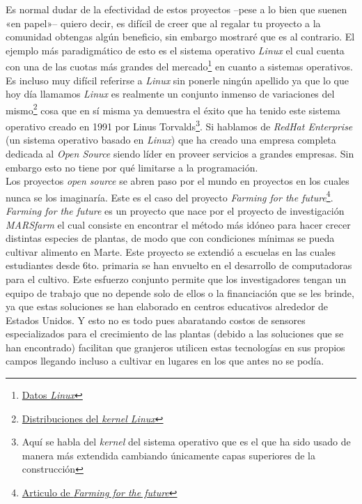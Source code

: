\documentclass{article}
\begin{document}
Es normal dudar de la efectividad de estos proyectos –pese a lo bien que suenen «en papel»– quiero decir, es difícil de creer que al regalar tu proyecto a la comunidad obtengas algún beneficio, sin embargo mostraré que es al contrario. El ejemplo más paradigmático de esto es el sistema operativo \textit{Linux} el cual cuenta con una de las cuotas más grandes del mercado\footnote{\href{https://en.wikipedia.org/wiki/Usage_share_of_operating_systems\#Market_share_by_category}{Datos \textit{Linux}}} en cuanto a sistemas operativos. Es incluso muy difícil referirse a \textit{Linux} sin ponerle ningún apellido ya que lo que hoy día llamamos \textit{Linux} es realmente un conjunto inmenso de variaciones del mismo\footnote{\href{https://upload.wikimedia.org/wikipedia/commons/1/1b/Linux_Distribution_Timeline.svg}{Distribuciones del \textit{kernel Linux}}} cosa que en sí misma ya demuestra el éxito que ha tenido este sistema operativo creado en 1991 por Linus Torvalds\footnote{Aquí se habla del \textit{kernel} del sistema operativo que es el que ha sido usado de manera más extendida cambiando únicamente capas superiores de la construcción}. Si hablamos de \textit{RedHat Enterprise} (un sistema operativo basado en \textit{Linux}) que ha creado una empresa completa dedicada al \textit{Open Source} siendo líder en proveer servicios a grandes empresas. Sin embargo esto no tiene por qué limitarse a la programación.\\

Los proyectos \textit{open source} se abren paso por el mundo en proyectos en los cuales nunca se los imaginaría. Este es el caso del proyecto \textit{Farming for the future}\footnote{\href{https://www.redhat.com/es/open-source-stories/farming-for-the-future}{Articulo de \textit{Farming for the future}}}. \textit{Farming for the future} es un proyecto que nace por el proyecto de investigación \textit{MARSfarm} el cual consiste en encontrar el método más idóneo para hacer crecer distintas especies de plantas, de modo que con condiciones mínimas se pueda cultivar alimento en Marte. Este proyecto se extendió a escuelas en las cuales estudiantes desde 6to. primaria se han envuelto en el desarrollo de computadoras para el cultivo. Este esfuerzo conjunto permite que los investigadores tengan un equipo de trabajo que no depende solo de ellos o la financiación que se les brinde, ya que estas soluciones se han elaborado en centros educativos alrededor de Estados Unidos. Y esto no es todo pues abaratando costos de sensores especializados para el crecimiento de las plantas (debido a las soluciones que se han encontrado) facilitan que granjeros utilicen estas tecnologías en sus propios campos llegando incluso a cultivar en lugares en los que antes no se podía.\\
\end{document}
